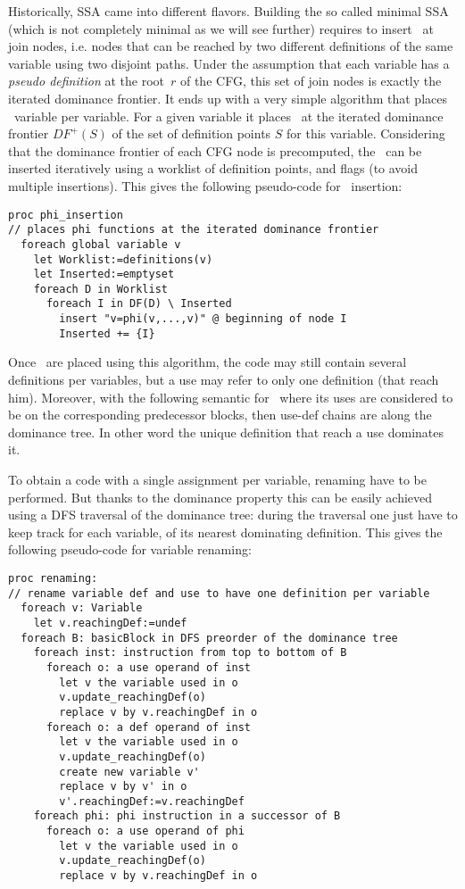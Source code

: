 Historically, SSA came into different flavors. Building the so called minimal SSA (which is not completely minimal as we will see further) requires to insert \phiops\ at join nodes, i.e. nodes that can be reached by two different definitions of the same variable using two disjoint paths. 
Under the assumption that each variable has a {\em pseudo definition} at the root~$r$ of the CFG, this set of join nodes is exactly the iterated dominance frontier.
It ends up with a very simple algorithm that places \phiops\ variable per variable. 
For a given variable it places \phiops\ at the iterated dominance frontier $DF^{+}(S)$ of the set of definition points $S$ for this variable. 
Considering that the dominance frontier of each CFG node is precomputed, the \phiops\ can be inserted iteratively using a worklist of definition points, and flags (to avoid multiple insertions). 
This gives the following pseudo-code for \phiops\ insertion:
\begin{verbatim}
proc phi_insertion
// places phi functions at the iterated dominance frontier
  foreach global variable v
    let Worklist:=definitions(v)
    let Inserted:=emptyset
    foreach D in Worklist
      foreach I in DF(D) \ Inserted
        insert "v=phi(v,...,v)" @ beginning of node I
        Inserted += {I}
\end{verbatim}

Once \phiops\ are placed using this algorithm, the code may still contain several definitions per variables, but a use may refer to only one definition (that reach him). Moreover, with the following semantic for \phiops\ where its uses are considered to be on the corresponding predecessor blocks, then use-def chains are along the dominance tree. In other word the unique definition that reach a use dominates it. 

To obtain a code with a single assignment per variable, renaming have to be performed. But thanks to the dominance property this can be easily achieved using a DFS traversal of the dominance tree: 
during the traversal one just have to keep track for each variable, of its nearest dominating definition.
This gives the following pseudo-code for variable renaming:
\begin{verbatim}
proc renaming:
// rename variable def and use to have one definition per variable
  foreach v: Variable
    let v.reachingDef:=undef
  foreach B: basicBlock in DFS preorder of the dominance tree
    foreach inst: instruction from top to bottom of B
      foreach o: a use operand of inst
        let v the variable used in o
        v.update_reachingDef(o)
        replace v by v.reachingDef in o
      foreach o: a def operand of inst
        let v the variable used in o
        v.update_reachingDef(o)
        create new variable v'
        replace v by v' in o
        v'.reachingDef:=v.reachingDef
    foreach phi: phi instruction in a successor of B
      foreach o: a use operand of phi
        let v the variable used in o
        v.update_reachingDef(o)
        replace v by v.reachingDef in o
\end{verbatim}

